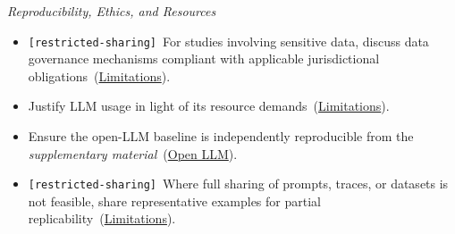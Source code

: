 \documentclass[smallextended]{svjour3}
\makeatletter
\newcommand{\must}{\textbf{must}\xspace}
\newcommand{\should}{\textbf{should}\xspace}
\newcommand{\supplementarymaterial}{\emph{supplementary material}\xspace}
\newcommand{\supplementarymaterial}{\emph{supplementary material}\xspace}
\newcommand{\iconM}{\usebox{\iconMbox}\xspace}
\newcommand{\iconS}{\usebox{\iconSbox}\xspace}
\newcommand{\iconM}{●\xspace}
\newcommand{\iconS}{○\xspace}
\newcommand{\condition}[1]{\texttt{\small[#1]}\,}
\newcommand{\condition}[1]{@@cond:#1@@}
\newcommand{\refopenllm}{\hyperref[sec:use-an-open-llm-as-a-baseline]{Open LLM}}
\newcommand{\reflimitations}{\hyperref[sec:report-limitations-and-mitigations]{Limitations}}
\newcommand{\refopenllm}{\href{/guidelines/open-llm/}{Open LLM}}
\newcommand{\reflimitations}{\href{/guidelines/limitations/}{Limitations}}
\makeatother
\begin{document}
\begin{appendices}
\noindent\textit{Reproducibility, Ethics, and Resources}
\begin{itemize}[label={},leftmargin=*]
    \item \iconM \condition{restricted-sharing} For studies involving sensitive data, discuss data governance mechanisms compliant with applicable jurisdictional obligations~(\reflimitations).
    \item \iconS Justify LLM usage in light of its resource demands~(\reflimitations).
    \item \iconS Ensure the open-LLM baseline is independently reproducible from the \supplementarymaterial~(\refopenllm).
    \item \iconS \condition{restricted-sharing} Where full sharing of prompts, traces, or datasets is not feasible, share representative examples for partial replicability~(\reflimitations).
\end{itemize}


\end{appendices}
\end{document}
